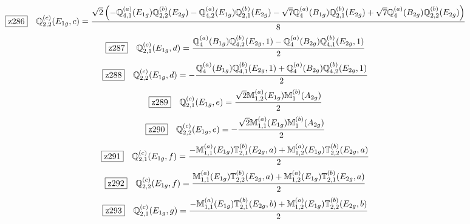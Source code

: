 \documentclass[fleqn,10pt,landscape]{jsarticle}
\begin{document}
\begin{dmath*}
\hspace*{3mm}\fbox{z286}\quad \mathbb{Q}_{2,2}^{(c)}(E_{1g},c)=\frac{\sqrt{2} \left(- \mathbb{Q}_{4,1}^{(a)}(E_{1g}) \mathbb{Q}_{2,2}^{(b)}(E_{2g}) - \mathbb{Q}_{4,2}^{(a)}(E_{1g}) \mathbb{Q}_{2,1}^{(b)}(E_{2g}) - \sqrt{7} \mathbb{Q}_{4}^{(a)}(B_{1g}) \mathbb{Q}_{2,1}^{(b)}(E_{2g}) + \sqrt{7} \mathbb{Q}_{4}^{(a)}(B_{2g}) \mathbb{Q}_{2,2}^{(b)}(E_{2g})\right)}{8}
\end{dmath*}
\begin{dmath*}
\hspace*{3mm}\fbox{z287}\quad \mathbb{Q}_{2,1}^{(c)}(E_{1g},d)=\frac{\mathbb{Q}_{4}^{(a)}(B_{1g}) \mathbb{Q}_{4,2}^{(b)}(E_{2g},1) - \mathbb{Q}_{4}^{(a)}(B_{2g}) \mathbb{Q}_{4,1}^{(b)}(E_{2g},1)}{2}
\end{dmath*}
\begin{dmath*}
\hspace*{3mm}\fbox{z288}\quad \mathbb{Q}_{2,2}^{(c)}(E_{1g},d)=- \frac{\mathbb{Q}_{4}^{(a)}(B_{1g}) \mathbb{Q}_{4,1}^{(b)}(E_{2g},1) + \mathbb{Q}_{4}^{(a)}(B_{2g}) \mathbb{Q}_{4,2}^{(b)}(E_{2g},1)}{2}
\end{dmath*}
\begin{dmath*}
\hspace*{3mm}\fbox{z289}\quad \mathbb{Q}_{2,1}^{(c)}(E_{1g},e)=\frac{\sqrt{2} \mathbb{M}_{1,2}^{(a)}(E_{1g}) \mathbb{M}_{1}^{(b)}(A_{2g})}{2}
\end{dmath*}
\begin{dmath*}
\hspace*{3mm}\fbox{z290}\quad \mathbb{Q}_{2,2}^{(c)}(E_{1g},e)=- \frac{\sqrt{2} \mathbb{M}_{1,1}^{(a)}(E_{1g}) \mathbb{M}_{1}^{(b)}(A_{2g})}{2}
\end{dmath*}
\begin{dmath*}
\hspace*{3mm}\fbox{z291}\quad \mathbb{Q}_{2,1}^{(c)}(E_{1g},f)=\frac{- \mathbb{M}_{1,1}^{(a)}(E_{1g}) \mathbb{T}_{2,1}^{(b)}(E_{2g},a) + \mathbb{M}_{1,2}^{(a)}(E_{1g}) \mathbb{T}_{2,2}^{(b)}(E_{2g},a)}{2}
\end{dmath*}
\begin{dmath*}
\hspace*{3mm}\fbox{z292}\quad \mathbb{Q}_{2,2}^{(c)}(E_{1g},f)=\frac{\mathbb{M}_{1,1}^{(a)}(E_{1g}) \mathbb{T}_{2,2}^{(b)}(E_{2g},a) + \mathbb{M}_{1,2}^{(a)}(E_{1g}) \mathbb{T}_{2,1}^{(b)}(E_{2g},a)}{2}
\end{dmath*}
\begin{dmath*}
\hspace*{3mm}\fbox{z293}\quad \mathbb{Q}_{2,1}^{(c)}(E_{1g},g)=\frac{- \mathbb{M}_{1,1}^{(a)}(E_{1g}) \mathbb{T}_{2,1}^{(b)}(E_{2g},b) + \mathbb{M}_{1,2}^{(a)}(E_{1g}) \mathbb{T}_{2,2}^{(b)}(E_{2g},b)}{2}
\end{dmath*}
\end{document}
